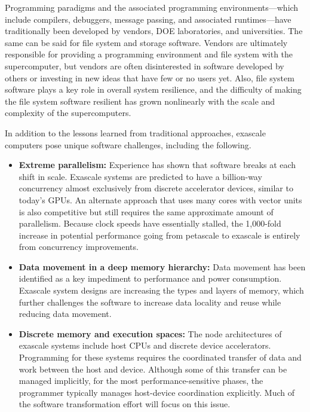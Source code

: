 Programming paradigms and the associated programming environments---which include compilers, debuggers, message passing, and associated runtimes---have traditionally been developed by vendors, DOE laboratories, and universities. The same can be said for file system and storage software. Vendors are ultimately responsible for providing a programming environment and file system with the supercomputer, but vendors are often disinterested in software developed by others or investing in new ideas that have few or no users yet. Also, file system software plays a key role in overall system resilience, and the difficulty of making the file system software resilient has grown nonlinearly with the scale and complexity of the supercomputers.
 
In addition to the lessons learned from traditional approaches, exascale computers pose unique software challenges, including the following.
\begin{itemize}
\item \textbf{Extreme parallelism:} Experience has shown that software breaks at each shift in scale. Exascale systems are predicted to have a billion-way concurrency almost exclusively from discrete accelerator devices, similar to today's GPUs. An alternate approach that uses many cores with vector units is also competitive but still requires the same approximate amount of parallelism.  Because clock speeds have essentially stalled, the 1,000-fold increase in potential performance going from petascale to exascale is entirely from concurrency improvements.
\item \textbf{Data movement in a deep memory hierarchy: }Data movement has been identified as a key impediment to performance and power consumption. Exascale system designs are increasing the types and layers of memory, which further challenges the software to increase data locality and reuse while reducing data movement.
\item \textbf{Discrete memory and execution spaces:} The node architectures of exascale systems include host CPUs and discrete device accelerators.  Programming for these systems requires the coordinated transfer of data and work between the host and device. Although some of this transfer can be managed implicitly, for the most performance-sensitive phases, the programmer typically manages host-device coordination explicitly.  Much of the software transformation effort will focus on this issue.
\end{itemize}
 
